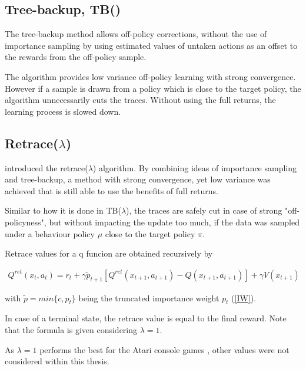 \subsection{Tree-backup, TB(\lambda)}

The tree-backup method allows off-policy corrections, without the use of importance sampling by using estimated values of untaken actions as an offset to the rewards from the off-policy sample. \citet{Precup00}

The algorithm provides low variance off-policy learning with strong convergence.
However if a sample is drawn from a policy which is close to the target policy, the algorithm unnecessarily cuts the traces. Without using the full returns, the learning process is slowed down.
\pagebreak
\subsection{Retrace($\lambda$)}

\citet{Munos16} introduced the retrace($\lambda$) algorithm. By combining ideas of importance sampling and tree-backup, a method with strong convergence, yet low variance was achieved that is still able to use the benefits of full returns.

Similar to how it is done in TB($\lambda$), the traces are safely cut in case of strong "off-policyness", but without impacting the update too much, if the data was sampled under a behaviour policy $\mu$ close to the target policy $\pi$.

Retrace values for a q funcion are obtained recursively by

\begin{align}
{
Q^{ret}(x_t,a_t)=r_t+\gamma \tilde{p}_{t+1} [Q^{ret}(x_{t+1},a_{t+1} ) -  Q(x_{t+1},a_{t+1})] + \gamma V(x_{t+1})
}
\label{qretrace}
\end{align}

with $\tilde{p} = min\{c,p_t\}$ being the truncated importance weight $p_t$ (\ref{IW}).

In case of a terminal state, the retrace value is equal to the final reward.
Note that the formula is given considering $\lambda = 1$.

As $\lambda = 1$ performs the best for the Atari console games \citep{Munos16}, other values were not considered within this thesis.

\pagebreak
